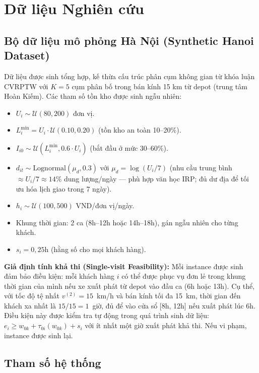 \documentclass[12pt,a4paper]{article}
\begin{document}
\section{Dữ liệu Nghiên cứu}

\subsection{Bộ dữ liệu mô phỏng Hà Nội (Synthetic Hanoi Dataset)}

Dữ liệu được sinh tổng hợp, kế thừa cấu trúc phân cụm không gian từ khóa luận CVRPTW
với $K=5$ cụm phân bố trong bán kính 15 km từ depot (trung tâm Hoàn Kiếm). Các tham số
tồn kho được sinh ngẫu nhiên:

\begin{itemize}[leftmargin=*]
  \item $U_i \sim \mathcal{U}(80, 200)$ đơn vị.
  \item $L_i^{\min} = U_i \cdot \mathcal{U}(0.10, 0.20)$ (tồn kho an toàn 10--20\%).
  \item $I_{i0} \sim \mathcal{U}(L_i^{\min}, 0.6 \cdot U_i)$ (bắt đầu ở mức 30--60\%).
  \item $d_{it} \sim \text{Lognormal}(\mu_d, 0.3)$ với $\mu_d = \log(U_i/7)$
        (nhu cầu trung bình $\approx U_i/7 \approx 14\%$ dung lượng/ngày ---
        phù hợp văn học IRP; đủ dư địa để tối ưu hóa lịch giao trong 7 ngày).
  \item $h_i \sim \mathcal{U}(100, 500)$ VND/đơn vị/ngày.
  \item Khung thời gian: 2 ca (8h--12h hoặc 14h--18h), gán ngẫu nhiên cho từng khách.
  \item $s_i = 0{,}25$h (hằng số cho mọi khách hàng).
\end{itemize}

\noindent\textbf{Giả định tính khả thi (Single-visit Feasibility):}
Mỗi instance được sinh đảm bảo điều kiện: mỗi khách hàng $i$ có thể được phục vụ đơn
lẻ trong khung thời gian của mình nếu xe xuất phát từ depot vào đầu ca (6h hoặc 13h).
Cụ thể, với tốc độ tệ nhất $v^{(2)} = 15$~km/h và bán kính tối đa 15~km, thời gian đến
khách xa nhất là $15/15 = 1$~giờ, đủ để vào cửa sổ [8h, 12h] nếu xuất phát lúc 6h.
Điều kiện này được kiểm tra tự động trong quá trình sinh dữ liệu:
$e_i \geq w_{0k} + \tau_{0i}(w_{0k}) + s_i$ với ít nhất một giờ xuất phát khả thi.
Nếu vi phạm, instance được sinh lại.

\subsection{Tham số hệ thống}
\end{document}
